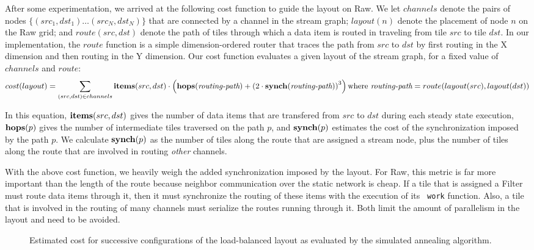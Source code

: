After some experimentation, we arrived at the following cost function
to guide the layout on Raw.  We let $channels$ denote the pairs of
nodes $\{(src_1, dst_1) \dots (src_N, dst_N)\}$ that are connected by
a channel in the stream graph; $layout(n)$ denote the placement of
node $n$ on the Raw grid; and $route(src, dst)$ denote the path of
tiles through which a data item is routed in traveling from tile $src$
to tile $dst$.  In our implementation, the $route$ function is a
simple dimension-ordered router that traces the path from $src$ to
$dst$ by first routing in the X dimension and then routing in the Y
dimension.  Our cost function evaluates a given layout of the stream
graph, for a fixed value of $channels$ and $route$:
\begin{align*}
cost(layout) =  \sum_{(src,dst) \in channels}
 {\bf items}(src,dst)
\cdot  \left( {\bf hops}(\mbox{\it routing-path}) + 
  \left( 2 \cdot
{\bf synch}(\mbox{\it routing-path}) \right) ^{3} \right)  
\mbox{where } 
\mbox{\it routing-path} = route(layout(src), layout(dst))
\end{align*}

In this equation, ${\bf items}(src, dst)$ gives the number of data
items that are transfered from $src$ to $dst$ during each steady state
execution, ${\bf hops}(p)$ gives the number of intermediate tiles
traversed on the path $p$, and ${\bf synch}(p)$ estimates the cost of
the synchronization imposed by the path $p$.  We calculate ${\bf
synch}(p)$ as the number of tiles along the route that are assigned a
stream node, plus the number of tiles along the route that are
involved in routing {\it other} channels.

With the above cost function, we heavily weigh the added
synchronization imposed by the layout.  For Raw, this metric is far
more important than the length of the route because neighbor
communication over the static network is cheap.  If a tile that is
assigned a Filter must route data items through it, then it must
synchronize the routing of these items with the execution of its {\tt
work} function.  Also, a tile that is involved in the routing of many
channels must serialize the routes running through it.  Both limit the
amount of parallelism in the layout and need to be avoided.

\begin{figure}
\centering
{}
\parbox{4in}{\caption{\protect\small Estimated cost for successive
configurations of the load-balanced \BeamFormer layout as evaluated by
the simulated annealing algorithm. \protect\label{fig:anneal-cost}}}
\end{figure}

